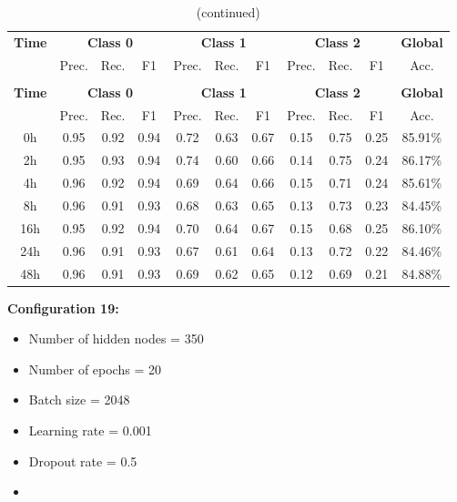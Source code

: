 \documentclass[12pt,oneside]{book} %
\begin{document}
\setlength\LTleft{1cm}
\begin{longtable}{ c ccc ccc ccc c}
\caption{Performance metrics of the LNN model for configuration 18} \\
\toprule
\textbf{Time} & \multicolumn{3}{c}{\textbf{Class 0}} & \multicolumn{3}{c}{\textbf{Class 1}} & \multicolumn{3}{c}{\textbf{Class 2}} & \textbf{Global} \\
               & Prec. & Rec. & F1  & Prec. & Rec. & F1   & Prec. & Rec. & F1  & Acc. \\
\midrule
\endfirsthead

\caption[]{(continued)} \\
\toprule
\textbf{Time} & \multicolumn{3}{c}{\textbf{Class 0}} & \multicolumn{3}{c}{\textbf{Class 1}} & \multicolumn{3}{c}{\textbf{Class 2}} & \textbf{Global} \\
               & Prec. & Rec. & F1  & Prec. & Rec. & F1   & Prec. & Rec. & F1  & Acc. \\
\midrule
\endhead

\bottomrule
\endfoot

\bottomrule
\endlastfoot

0h   & 0.95  & 0.92 & 0.94 & 0.72  & 0.63 & 0.67  & 0.15  & 0.75 & 0.25 & 85.91\% \\
2h   & 0.95  & 0.93 & 0.94 & 0.74  & 0.60 & 0.66  & 0.14  & 0.75 & 0.24 & 86.17\% \\
4h   & 0.96  & 0.92 & 0.94 & 0.69  & 0.64 & 0.66  & 0.15  & 0.71 & 0.24 & 85.61\% \\
8h   & 0.96  & 0.91 & 0.93 & 0.68  & 0.63 & 0.65  & 0.13  & 0.73 & 0.23 & 84.45\% \\
16h  & 0.95  & 0.92 & 0.94 & 0.70  & 0.64 & 0.67  & 0.15  & 0.68 & 0.25 & 86.10\% \\
24h  & 0.96  & 0.91 & 0.93 & 0.67  & 0.61 & 0.64  & 0.13  & 0.72 & 0.22 & 84.46\% \\
48h  & 0.96  & 0.91 & 0.93 & 0.69  & 0.62 & 0.65  & 0.12  & 0.69 & 0.21 & 84.88\% \\
\end{longtable}

\noindent \textbf{Configuration 19:}
\begin{multicols}{2}
    \begin{itemize}
        \item Number of hidden nodes = 350
        \item Number of epochs = 20
        \item Batch size = 2048
    \end{itemize}
    \begin{itemize}
         \item Learning rate = 0.001
         \item Dropout rate  = 0.5
         \item[\hspace{0pt}]
    \end{itemize}
\end{multicols}
\end{document}

